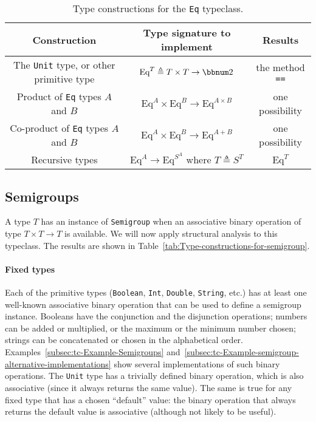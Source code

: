 \begin{table}
\begin{centering}
\begin{tabular}{|c|c|c|}
\hline 
\textbf{\footnotesize{}Construction} & \textbf{\footnotesize{}Type signature to implement} & \textbf{\footnotesize{}Results}\tabularnewline
\hline 
\hline 
{\footnotesize{}The }\lstinline!Unit!{\footnotesize{} type, or other
primitive type} & {\footnotesize{}$\text{Eq}^{T}\triangleq T\times T\rightarrow\bbnum 2$} & {\footnotesize{}the method }\lstinline!==!\tabularnewline
\hline 
{\footnotesize{}Product of }\lstinline!Eq!{\footnotesize{} types
$A$ and $B$} & {\footnotesize{}$\text{Eq}^{A}\times\text{Eq}^{B}\rightarrow\text{Eq}^{A\times B}$} & {\footnotesize{}one possibility}\tabularnewline
\hline 
{\footnotesize{}Co-product of }\lstinline!Eq!{\footnotesize{} types
$A$ and $B$} & {\footnotesize{}$\text{Eq}^{A}\times\text{Eq}^{B}\rightarrow\text{Eq}^{A+B}$} & {\footnotesize{}one possibility}\tabularnewline
\hline 
{\footnotesize{}Recursive types} & {\footnotesize{}$\text{Eq}^{A}\rightarrow\text{Eq}^{S^{A}}$ where
$T\triangleq S^{T}$} & {\footnotesize{}$\text{Eq}^{T}$}\tabularnewline
\hline 
\end{tabular}
\par\end{centering}
\caption{Type constructions for the \lstinline!Eq! typeclass.\label{tab:Type-constructions-for-Eq}}
\end{table}


\subsection{Semigroups\label{subsec:Semigroups-constructions}}

A type $T$ has an instance of \lstinline!Semigroup! when an associative
binary operation of type $T\times T\rightarrow T$ is available. We
will now apply structural analysis to this typeclass. The results
are shown in Table~\ref{tab:Type-constructions-for-semigroup}.

\paragraph{Fixed types}

Each of the primitive types (\lstinline!Boolean!, \lstinline!Int!,
\lstinline!Double!, \lstinline!String!, etc.) has at least one well-known
associative binary operation that can be used to define a semigroup
instance. Booleans have the conjunction and the disjunction operations;
numbers can be added or multiplied, or the maximum or the minimum
number chosen; strings can be concatenated or chosen in the alphabetical
order. Examples~\ref{subsec:tc-Example-Semigroups} and~\ref{subsec:tc-Example-semigroup-alternative-implementations}
show several implementations of such binary operations. The \lstinline!Unit!
type has a trivially defined binary operation, which is also associative
(since it always returns the same value). The same is true for any
fixed type that has a chosen ``default'' value: the binary operation
that always returns the default value is associative (although not
likely to be useful).

